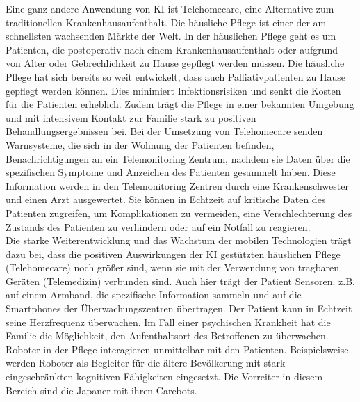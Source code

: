 Eine ganz andere  Anwendung von KI ist Telehomecare, eine Alternative zum traditionellen Krankenhausaufenthalt.\cite{Chapter_14} Die häusliche Pflege ist einer der am schnellsten wachsenden Märkte der Welt.\cite{Chapter_14} In der häuslichen Pflege geht es um Patienten, die postoperativ nach einem Krankenhausaufenthalt oder aufgrund von Alter oder Gebrechlichkeit zu Hause gepflegt werden müssen. Die häusliche Pflege hat sich bereits so weit entwickelt, dass auch Palliativpatienten zu Hause gepflegt werden können. Dies minimiert Infektionsrisiken und senkt die Kosten für die Patienten erheblich. Zudem trägt die Pflege in einer bekannten Umgebung und mit intensivem Kontakt zur Familie stark zu positiven Behandlungsergebnissen bei.
Bei der Umsetzung von Telehomecare senden Warnsysteme, die sich in der Wohnung der Patienten befinden, Benachrichtigungen an ein Telemonitoring Zentrum, nachdem sie Daten über die spezifischen Symptome und Anzeichen des Patienten gesammelt haben.\cite{Chapter_14} Diese Information werden in den Telemonitoring Zentren durch eine Krankenschwester und einen Arzt ausgewertet. Sie können in Echtzeit auf kritische Daten des Patienten zugreifen, um Komplikationen zu vermeiden, eine Verschlechterung des Zustands des Patienten zu verhindern oder auf ein Notfall zu reagieren.\cite{Chapter_14}\\
Die starke Weiterentwicklung und das Wachstum der mobilen Technologien trägt dazu bei, dass die positiven Auswirkungen der KI gestützten häuslichen Pflege (Telehomecare) noch größer sind, wenn sie mit der Verwendung von tragbaren Geräten (Telemedizin) verbunden sind. Auch hier trägt der Patient Sensoren. z.B. auf einem Armband, die spezifische Information sammeln und auf die Smartphones der Überwachungszentren übertragen. \cite{Chapter_14} Der Patient kann in Echtzeit seine Herzfrequenz überwachen. Im Fall einer psychischen Krankheit hat die Familie die Möglichkeit, den Aufenthaltsort des Betroffenen zu überwachen.\cite{Chapter_14}\\ 

Roboter in der Pflege interagieren unmittelbar mit den Patienten. Beispielsweise werden Roboter als Begleiter für die ältere Bevölkerung mit stark eingeschränkten kognitiven Fähigkeiten eingesetzt. Die Vorreiter in diesem Bereich sind die Japaner mit ihren Carebots.